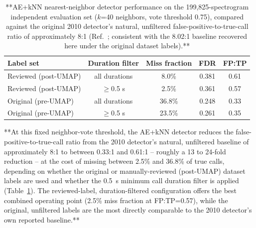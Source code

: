 \documentclass[preprint,NumberedRefs]{JASAnew}
\begin{document}
\begin{table}[ht]
    \centering
    \caption{**AE+kNN nearest-neighbor detector performance on the
    199,825-spectrogram independent evaluation set ($k$=40 neighbors, vote
    threshold 0.75), compared against the original 2010 detector's natural,
    unfiltered false-positive-to-true-call ratio of approximately 8:1
    (Ref.~; consistent with the 8.02:1 baseline
    recovered here under the original dataset labels).**}
    \label{tab:ae_knn_results}
    \begin{tabular}{|l|c|c|c|c|}
        \hline
        Label set & Duration filter & Miss fraction & FDR & FP:TP \\
        \hline
        Reviewed (post-UMAP) & all durations     & 8.0\%  & 0.381 & 0.61 \\
        Reviewed (post-UMAP) & $\geq$0.5 s        & 2.5\%  & 0.361 & 0.57 \\
        Original (pre-UMAP)  & all durations     & 36.8\% & 0.248 & 0.33 \\
        Original (pre-UMAP)  & $\geq$0.5 s        & 23.5\% & 0.261 & 0.35 \\
        \hline
    \end{tabular}
\end{table}

**At this fixed neighbor-vote threshold, the AE+kNN detector reduces the false-positive-to-true-call ratio from the 2010 detector's natural, unfiltered baseline of approximately 8:1 to between 0.33:1 and 0.61:1 -- roughly a 13 to 24-fold reduction -- at the cost of missing between 2.5\% and 36.8\% of true calls, depending on whether the original or manually-reviewed (post-UMAP) dataset labels are used and whether the 0.5~s minimum call duration filter is
applied (Table~\ref{tab:ae_knn_results}). The reviewed-label, duration-filtered configuration offers the best combined operating point (2.5\% miss fraction at
FP:TP=0.57), while the original, unfiltered labels are the most directly comparable to the 2010 detector's own reported baseline.**

\end{document}
